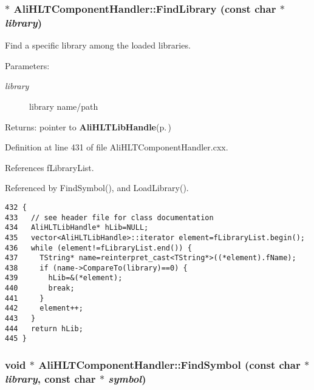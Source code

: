 \subsubsection{ $\ast$ Ali\-HLTComponent\-Handler::Find\-Library (const char $\ast$ {\em library})\hspace{0.3cm}{\tt  [private]}}\label{classAliHLTComponentHandler_d4}


Find a specific library among the loaded libraries. \begin{Desc}
\item[Parameters:]
\begin{description}
\item[{\em library}]library name/path \end{description}
\end{Desc}
\begin{Desc}
\item[Returns:]pointer to {\bf Ali\-HLTLib\-Handle}{\rm (p.\,\pageref{structAliHLTComponentHandler_1_1AliHLTLibHandle})} \end{Desc}


Definition at line 431 of file Ali\-HLTComponent\-Handler.cxx.

References f\-Library\-List.

Referenced by Find\-Symbol(), and Load\-Library().

\footnotesize\begin{verbatim}432 {
433   // see header file for class documentation
434   AliHLTLibHandle* hLib=NULL;
435   vector<AliHLTLibHandle>::iterator element=fLibraryList.begin();
436   while (element!=fLibraryList.end()) {
437     TString* name=reinterpret_cast<TString*>((*element).fName);
438     if (name->CompareTo(library)==0) {
439       hLib=&(*element);
440       break;
441     }
442     element++;
443   }
444   return hLib;
445 }
\end{verbatim}\normalsize 


\subsubsection{\setlength{\rightskip}{0pt plus 5cm}void $\ast$ Ali\-HLTComponent\-Handler::Find\-Symbol (const char $\ast$ {\em library}, const char $\ast$ {\em symbol})}\label{classAliHLTComponentHandler_a7}


